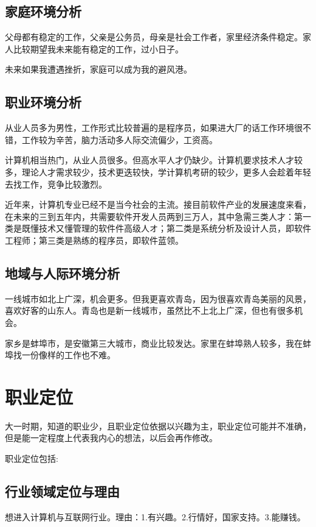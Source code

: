 \documentclass{article}
\begin{document}
\subsection{家庭环境分析}
父母都有稳定的工作，父亲是公务员，母亲是社会工作者，家里经济条件稳定。家人比较期望我未来能有稳定的工作，过小日子。\par
未来如果我遭遇挫折，家庭可以成为我的避风港。\par
\subsection{职业环境分析}
从业人员多为男性，工作形式比较普遍的是程序员，如果进大厂的话工作环境很不错，工作较为辛苦，脑力活动多人际交流偏少，工资高。\par
计算机相当热门，从业人员很多。但高水平人才仍缺少。计算机要求技术人才较多，理论人才需求较少，技术更迭较快，学计算机考研的较少，更多人会趁着年轻去找工作，竞争比较激烈。\par
近年来，计算机专业已经不是当今社会的主流。接目前软件产业的发展速度来看，在未来的三到五年内，共需要软件开发人员两到三万人，其中急需三类人才：第一类是既懂技术又懂管理的软件件高级人オ；第二类是系统分析及设计人员，即软件工程师；第三类是熟练的程序员，即软件蓝领。\par

\subsection{地域与人际环境分析}
一线城市如北上广深，机会更多。但我更喜欢青岛，因为很喜欢青岛美丽的风景，喜欢好客的山东人。青岛也是新一线城市，虽然比不上北上广深，但也有很多机会。\par
家乡是蚌埠市，是安徽第三大城市，商业比较发达。家里在蚌埠熟人较多，我在蚌埠找一份像样的工作也不难。\par


\section{职业定位}
大一时期，知道的职业少，且职业定位依据以兴趣为主，职业定位可能并不准确，但是能一定程度上代表我内心的想法，以后会再作修改。\par
职业定位包括:\par

\subsection{行业领域定位与理由}
想进入计算机与互联网行业。理由：1.有兴趣。2.行情好，国家支持。3.能赚钱。\par
\end{document}

